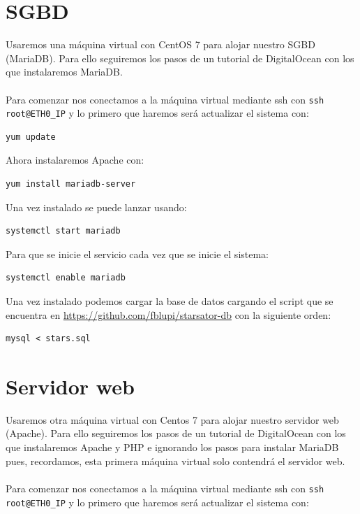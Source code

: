 \section{SGBD}

Usaremos una máquina virtual con CentOS 7 para alojar nuestro SGBD (MariaDB). Para ello seguiremos los pasos de un tutorial de DigitalOcean \cite{InstallMariaDBCentos7} con los que instalaremos MariaDB.
\\ \\
Para comenzar nos conectamos a la máquina virtual mediante ssh con \texttt{ssh root@ETH0\_IP} y lo primero que haremos será actualizar el sistema con:

\begin{lstlisting}
yum update
\end{lstlisting}

Ahora instalaremos Apache con:

\begin{lstlisting}
yum install mariadb-server
\end{lstlisting}

Una vez instalado se puede lanzar usando:

\begin{lstlisting}
systemctl start mariadb
\end{lstlisting}

Para que se inicie el servicio cada vez que se inicie el sistema:

\begin{lstlisting}
systemctl enable mariadb
\end{lstlisting}

Una vez instalado podemos cargar la base de datos cargando el script que se encuentra en \url{https://github.com/fblupi/starsator-db} con la siguiente orden:

\begin{lstlisting}
mysql < stars.sql
\end{lstlisting}

\section{Servidor web}

Usaremos otra máquina virtual con Centos 7 para alojar nuestro servidor web (Apache). Para ello seguiremos los pasos de un tutorial de DigitalOcean \cite{InstallLAMPCentos7} con los que instalaremos Apache y PHP e ignorando los pasos para instalar MariaDB pues, recordamos, esta primera máquina virtual solo contendrá el servidor web.
\\ \\
Para comenzar nos conectamos a la máquina virtual mediante ssh con \texttt{ssh root@ETH0\_IP} y lo primero que haremos será actualizar el sistema con:

